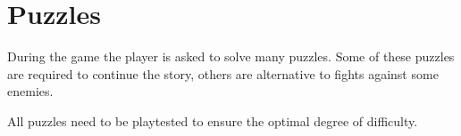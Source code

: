 \chapter{Puzzles}
During the game the player is asked to solve many puzzles. Some of these puzzles are required to continue the story, others are alternative to fights against some enemies.

All puzzles need to be playtested to ensure the optimal degree of difficulty.



